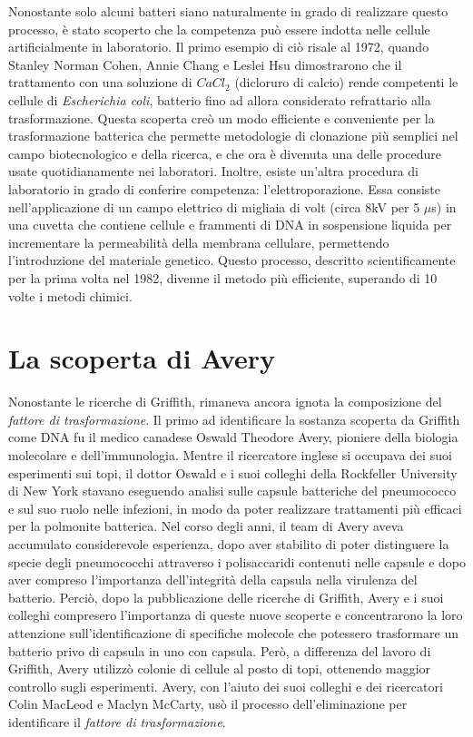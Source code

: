 \documentclass[11pt]{report}
\begin{document}
	 Nonostante solo alcuni batteri siano naturalmente in grado di realizzare questo processo, è stato scoperto che la competenza può essere indotta nelle cellule artificialmente in laboratorio. Il primo esempio di ciò risale al 1972, quando Stanley Norman Cohen, Annie Chang e Leslei Hsu dimostrarono che il trattamento con una soluzione di $CaCl_2$ (dicloruro di calcio)  rende competenti le cellule di \textit{Escherichia coli}, batterio fino ad allora considerato refrattario alla trasformazione.\cite{hanahan1983studies} Questa scoperta creò un modo efficiente e conveniente per la trasformazione batterica che permette metodologie di clonazione più semplici nel campo biotecnologico e della ricerca, e che ora è divenuta una delle procedure usate quotidianamente nei laboratori. Inoltre, esiste un'altra procedura di laboratorio in grado di conferire competenza: l'elettroporazione. Essa consiste nell'applicazione di un campo elettrico di migliaia di volt (circa 8kV per 5 $\mu$s) in una cuvetta che contiene cellule e frammenti di DNA in sospensione liquida per incrementare la permeabilità della membrana cellulare, permettendo l'introduzione del materiale genetico. Questo processo, descritto scientificamente per la prima volta nel 1982, divenne il metodo più efficiente, superando di 10 volte i metodi chimici.\cite{neumann1982gene}	
	 
	\section{La scoperta di Avery}
	
	Nonostante le ricerche di Griffith, rimaneva ancora ignota la composizione del \textit{fattore di trasformazione}. Il primo ad identificare la sostanza scoperta da Griffith come DNA fu il medico canadese Oswald Theodore Avery, pioniere della biologia molecolare e dell'immunologia. Mentre il ricercatore inglese si occupava dei suoi esperimenti sui topi, il dottor Oswald e i suoi colleghi della Rockfeller University di New York stavano eseguendo analisi sulle capsule batteriche del pneumococco e sul suo ruolo nelle infezioni, in modo da poter realizzare trattamenti più efficaci per la polmonite batterica. Nel corso degli anni, il team di Avery aveva accumulato considerevole esperienza, dopo aver stabilito di poter distinguere la specie degli pneumococchi attraverso i polisaccaridi contenuti nelle capsule e dopo aver compreso l'importanza dell'integrità della capsula nella virulenza del batterio. Perciò, dopo la pubblicazione delle ricerche di Griffith, Avery e i suoi colleghi compresero l'importanza di queste nuove scoperte e concentrarono la loro attenzione sull'identificazione di specifiche molecole che potessero trasformare un batterio privo di capsula in uno con capsula. Però, a differenza del lavoro di Griffith, Avery utilizzò colonie di cellule al posto di topi, ottenendo maggior controllo sugli esperimenti.
	Avery, con l'aiuto dei suoi colleghi e dei ricercatori Colin MacLeod e Maclyn McCarty, usò il processo dell'eliminazione per identificare il \textit{fattore di trasformazione}.
	
\end{document}
